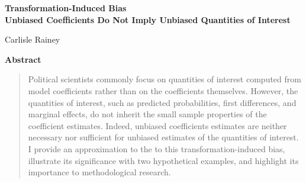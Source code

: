 \documentclass[12pt]{article}
\begin{document}
\begin{center}
{\LARGE \textbf{Transformation-Induced Bias}}\\\vspace{2mm}
{ \textbf{Unbiased Coefficients Do Not Imply Unbiased Quantities of Interest}}

\vspace{5mm}

Carlisle Rainey
\end{center}

\vspace{5mm}

{\centerline{\textbf{Abstract}}}
\begin{quote}\noindent
Political scientists commonly focus on quantities of interest computed from model coefficients rather than on the coefficients themselves. However, the quantities of interest, such as predicted probabilities, first differences, and marginal effects, do not inherit the small sample properties of the coefficient estimates. Indeed, unbiased coefficients estimates are neither necessary nor sufficient for unbiased estimates of the quantities of interest. I provide an approximation to the to this transformation-induced bias, illustrate its significance with two hypothetical examples, and highlight its importance to methodological research.
 \end{quote}



\thispagestyle{empty}

\doublespace

\end{document}
